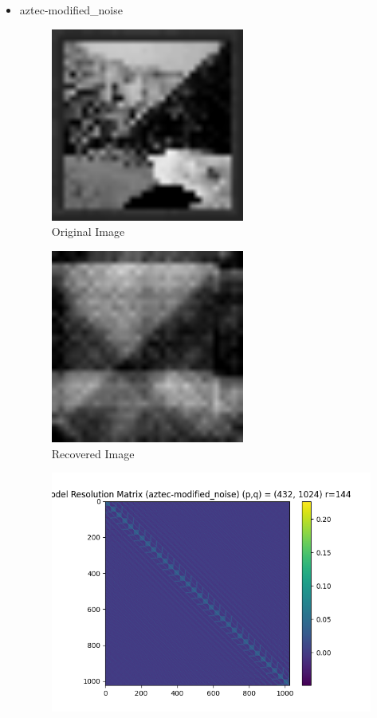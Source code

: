 \documentclass{article}
\begin{document}
\begin{itemize}
        \item aztec-modified\_noise
    \begin{figure}[h]
        \centering
        \includegraphics[width=0.6\textwidth]{images/greyscale/aztec-modified.png}
        \caption{Original Image}
    \end{figure}
    \begin{figure}[h]
        \centering
        \includegraphics[width=0.6\textwidth]{images/outputs/noise/aztec-modified_noise.png}
        \caption{Recovered Image}
    \end{figure}
    \begin{figure}[h]
        \centering
        \includegraphics[width=1\textwidth]{images/outputs/modelres/aztec-modified_noise.png}

\end{figure}
\end{itemize}
\end{document}

